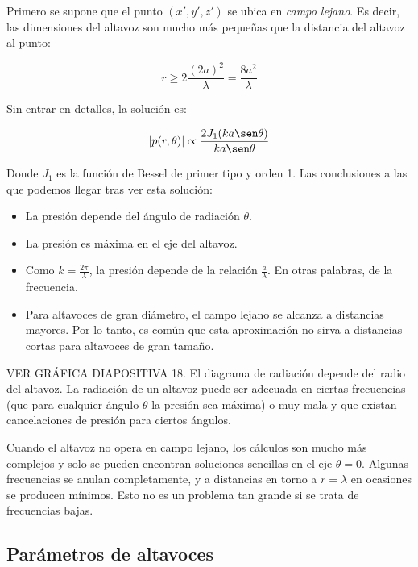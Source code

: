 \documentclass[12pt, a4paper]{article}
\begin{document}
Primero se supone que el punto $\left( x', y', z' \right)$ se ubica en \textit{campo lejano}. Es decir, las dimensiones del altavoz son mucho más pequeñas que la distancia del altavoz al punto:

\begin{equation} \label{eq:campo_lejano}
    r \geq 2 \frac{\left( 2a \right)^2}{\lambda} = \frac{8a^2}{\lambda}    
\end{equation}

Sin entrar en detalles, la solución es:

\begin{equation} \label{eq:presion_punto}
    \abs{p(r,\theta)} \propto \frac{2 J_1(ka \sen \theta)}{ka \sen \theta}
\end{equation}

Donde $J_1$ es la función de Bessel de primer tipo y orden 1. Las conclusiones a las que podemos llegar tras ver esta solución:

\begin{itemize}
    \item La presión depende del ángulo de radiación $\theta$.
    \item La presión es máxima en el eje del altavoz.
    \item Como $k= \frac{2\pi}{\lambda}$, la presión depende de la relación $\frac{a}{\lambda}$. En otras palabras, de la frecuencia.
    \item Para altavoces de gran diámetro, el campo lejano se alcanza a distancias mayores. Por lo tanto, es común que esta aproximación no sirva a distancias cortas para altavoces de gran tamaño.
\end{itemize}

VER GRÁFICA DIAPOSITIVA 18. El diagrama de radiación depende del radio del altavoz. La radiación de un altavoz puede ser adecuada en ciertas frecuencias (que para cualquier ángulo $\theta$ la presión sea máxima) o muy mala y que existan cancelaciones de presión para ciertos ángulos.

Cuando el altavoz no opera en campo lejano, los cálculos son mucho más complejos y solo se pueden encontran soluciones sencillas en el eje $\theta=0$. Algunas frecuencias se anulan completamente, y a distancias en torno a $r=\lambda$ en ocasiones se producen mínimos. Esto no es un problema tan grande si se trata de frecuencias bajas.

\subsection{Parámetros de altavoces}
\end{document}
